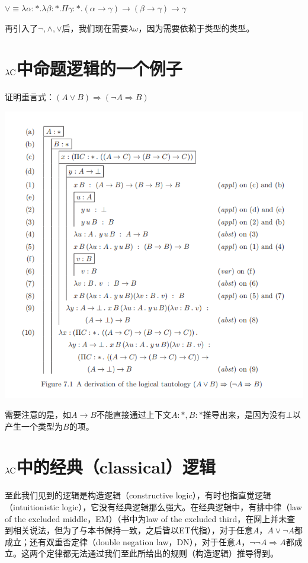 \documentclass[UTF8]{article}
\begin{document}
		$\lor\equiv\lambda\alpha:*.\lambda\beta:*.\Pi\gamma:*.(\alpha\rightarrow\gamma)\rightarrow(\beta\rightarrow\gamma)\rightarrow\gamma$
		
		再引入了$\neg,\land,\lor$后，我们现在需要$\lambda{\omega}$，因为需要依赖于类型的类型。
	
	\section{$\lambda{\rm C}$中命题逻辑的一个例子}
	\noindent
	证明重言式：$(A\lor B)\Rightarrow(\neg A\Rightarrow B)$
	
		\noindent
		\includegraphics[width=0.93\linewidth]{"../imgs/7-1.png"}
	
		需要注意的是，如$A\rightarrow B$不能直接通过上下文$A:*,B:*$推导出来，是因为没有$\bot$以产生一个类型为$B$的项。
	
	\section{$\lambda{\rm C}$中的经典（classical）逻辑}
	\noindent
	至此我们见到的逻辑是构造逻辑（constructive logic），有时也指直觉逻辑（intuitionistic logic），它没有经典逻辑那么强大。在经典逻辑中，有排中律（law of the excluded middle，EM）（书中为law of the excluded third，在网上并未查到相关说法，但为了与本书保持一致，之后皆以ET代指），对于任意$A$，$A\lor\neg A$都成立；还有双重否定律（double  negation law，DN），对于任意$A$，$\neg\neg A\Rightarrow A$都成立。这两个定律都无法通过我们至此所给出的规则（构造逻辑）推导得到。
	
\end{document}

